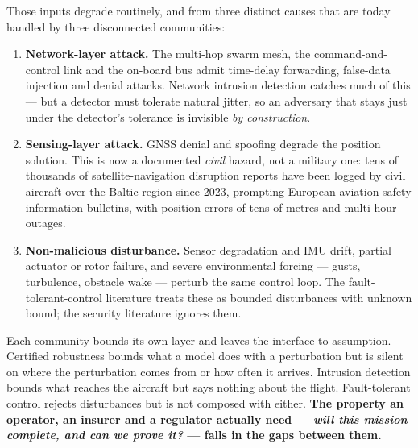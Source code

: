 \documentclass[11pt,a4paper]{article}
\begin{document}
Those inputs degrade routinely, and from three distinct causes that are today handled by three disconnected communities:
\begin{enumerate}
\item \textbf{Network-layer attack.} The multi-hop swarm mesh, the command-and-control link and the on-board bus admit time-delay forwarding, false-data injection and denial attacks. Network intrusion detection catches much of this --- but a detector must tolerate natural jitter, so an adversary that stays just under the detector's tolerance is invisible \emph{by construction}.
\item \textbf{Sensing-layer attack.} GNSS denial and spoofing degrade the position solution. This is now a documented \emph{civil} hazard, not a military one: tens of thousands of satellite-navigation disruption reports have been logged by civil aircraft over the Baltic region since 2023, prompting European aviation-safety information bulletins, with position errors of tens of metres and multi-hour outages.
\item \textbf{Non-malicious disturbance.} Sensor degradation and IMU drift, partial actuator or rotor failure, and severe environmental forcing --- gusts, turbulence, obstacle wake --- perturb the same control loop. The fault-tolerant-control literature treats these as bounded disturbances with unknown bound; the security literature ignores them.
\end{enumerate}

Each community bounds its own layer and leaves the interface to assumption. Certified robustness bounds what a model does with a perturbation but is silent on where the perturbation comes from or how often it arrives. Intrusion detection bounds what reaches the aircraft but says nothing about the flight. Fault-tolerant control rejects disturbances but is not composed with either. \textbf{The property an operator, an insurer and a regulator actually need --- \emph{will this mission complete, and can we prove it?} --- falls in the gaps between them.}
\end{document}
